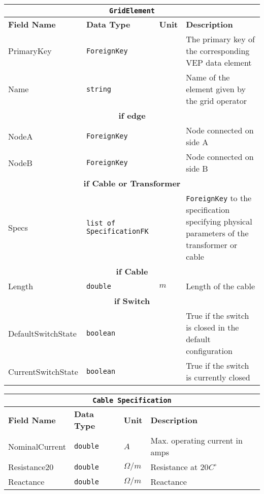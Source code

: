 \begin{tabular}{ l p{3cm} l p{8cm}} 
    \hline
    \multicolumn{4}{c}{\texttt{GridElement}}\\
    \hline
    \textbf{Field Name} & \textbf{Data Type}            & \textbf{Unit} & \textbf{Description} \\
    \hline
    PrimaryKey          & \texttt{ForeignKey}           &               & The primary key of the corresponding VEP data element\\
    Name                & \texttt{string}               &               & Name of the element given by the grid operator\\
    \hline
    \multicolumn{4}{c}{\textbf{if edge}}\\
    \hline
    NodeA               & \texttt{ForeignKey}           &               & Node connected on side A\\
    NodeB               & \texttt{ForeignKey}           &               & Node connected on side B\\
    \hline
    \multicolumn{4}{c}{\textbf{if Cable or Transformer}}\\
    \hline
    Specs               & \texttt{list of SpecificationFK}             &               & \texttt{ForeignKey} to the specification specifying physical parameters of the transformer or cable\\
    \hline
    \multicolumn{4}{c}{\textbf{if Cable}}\\
    \hline
    Length              & \texttt{double}              &  $m$          & Length of the cable\\
    \hline
    \multicolumn{4}{c}{\textbf{if Switch}}\\
    \hline
    DefaultSwitchState  & \texttt{boolean}             &               & True if the switch is closed in the default configuration\\
    CurrentSwitchState  & \texttt{boolean}             &               & True if the switch is currently closed\\
\end{tabular}

\vspace{.5cm}

\begin{tabular}{ l p{3cm} l p{8cm}} 
    \hline
    \multicolumn{4}{c}{\texttt{Cable Specification}}\\
    \hline
    \textbf{Field Name} & \textbf{Data Type}        & \textbf{Unit} & \textbf{Description} \\
    \hline
    NominalCurrent      & \texttt{double}           & $A$           & Max. operating current in amps\\              
    Resistance20        & \texttt{double}           & $\Omega/m$    & Resistance at $20C^\circ$\\  
    Reactance           & \texttt{double}           & $\Omega/m$    & Reactance\\              
\end{tabular}

